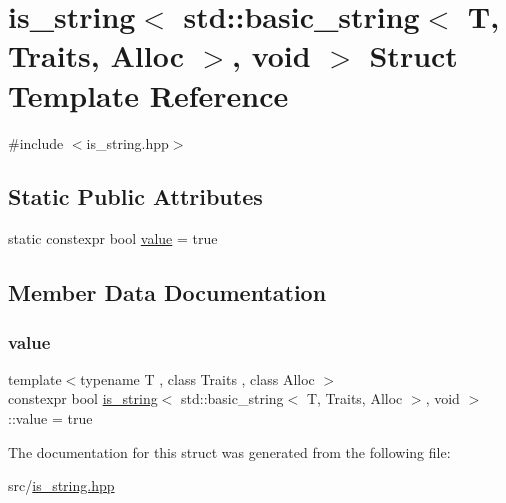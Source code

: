 \hypertarget{structis__string_3_01std_1_1basic__string_3_01T_00_01Traits_00_01Alloc_01_4_00_01void_01_4}{}\section{is\+\_\+string$<$ std\+:\+:basic\+\_\+string$<$ T, Traits, Alloc $>$, void $>$ Struct Template Reference}
\label{structis__string_3_01std_1_1basic__string_3_01T_00_01Traits_00_01Alloc_01_4_00_01void_01_4}


{\ttfamily \#include $<$is\+\_\+string.\+hpp$>$}

\subsection*{Static Public Attributes}
\begin{DoxyCompactItemize}
\item 
static constexpr bool \hyperlink{structis__string_3_01std_1_1basic__string_3_01T_00_01Traits_00_01Alloc_01_4_00_01void_01_4_ad067ab285d00dda3bf3ef0d9dd3bedac}{value} = true
\end{DoxyCompactItemize}


\subsection{Member Data Documentation}
\mbox{\label{structis__string_3_01std_1_1basic__string_3_01T_00_01Traits_00_01Alloc_01_4_00_01void_01_4_ad067ab285d00dda3bf3ef0d9dd3bedac}} 
\subsubsection{\texorpdfstring{value}{value}}
{\footnotesize\ttfamily template$<$typename T , class Traits , class Alloc $>$ \\
constexpr bool \hyperlink{structis__string}{is\+\_\+string}$<$ std\+::basic\+\_\+string$<$ T, Traits, Alloc $>$, void $>$\+::value = true\hspace{0.3cm}{\ttfamily [static]}}



The documentation for this struct was generated from the following file\+:\begin{DoxyCompactItemize}
\item 
src/\hyperlink{is__string_8hpp}{is\+\_\+string.\+hpp}\end{DoxyCompactItemize}
